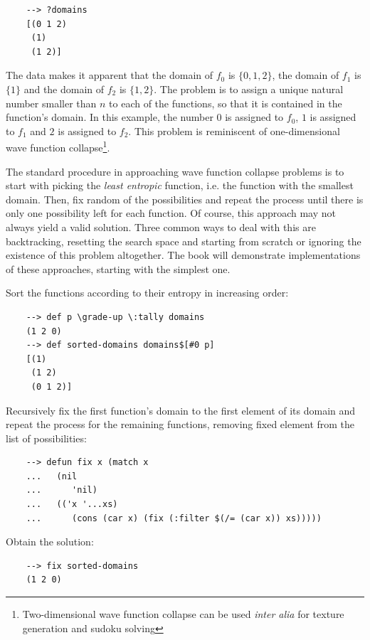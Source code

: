 \begin{Verbatim}
    --> ?domains
    [(0 1 2)
     (1)
     (1 2)]
\end{Verbatim}

The data makes it apparent that the domain of $f_0$ is $\{0,1,2\}$, the domain of $f_1$ is $\{1\}$ and the domain of $f_2$ is $\{1,2\}$. The problem is to assign a unique natural number smaller than $n$ to each of the functions, so that it is contained in the function's domain. In this example, the number $0$ is assigned to $f_0$, $1$ is assigned to $f_1$ and $2$ is assigned to $f_2$. This problem is reminiscent of one-dimensional wave function collapse\footnote{Two-dimensional wave function collapse can be used \textit{inter alia} for texture generation and sudoku solving}.

The standard procedure in approaching wave function collapse problems is to start with picking the \textit{least entropic} function, i.e. the function with the smallest domain. Then, fix random of the possibilities and repeat the process until there is only one possibility left for each function. Of course, this approach may not always yield a valid solution. Three common ways to deal with this are backtracking, resetting the search space and starting from scratch or ignoring the existence of this problem altogether. The book will demonstrate implementations of these approaches, starting with the simplest one.

Sort the functions according to their entropy in increasing order:

\begin{Verbatim}
    --> def p \grade-up \:tally domains
    (1 2 0)
    --> def sorted-domains domains$[#0 p]
    [(1)
     (1 2)
     (0 1 2)]
\end{Verbatim}

Recursively fix the first function's domain to the first element of its domain and repeat the process for the remaining functions, removing fixed element from the list of possibilities:

\begin{Verbatim}
    --> defun fix x (match x
    ...   (nil
    ...      'nil)
    ...   (('x '...xs)
    ...      (cons (car x) (fix (:filter $(/= (car x)) xs)))))
\end{Verbatim}

Obtain the solution:

\begin{Verbatim}
    --> fix sorted-domains
    (1 2 0)
\end{Verbatim}

